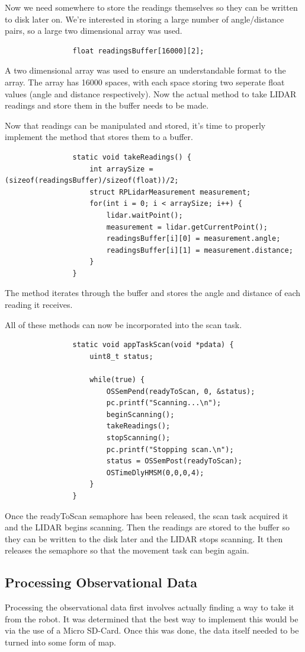 				Now we need somewhere to store the readings themselves so they can be written to disk later on. We're interested in storing a large number of angle/distance pairs, so a large two dimensional array was used.
				\begin{lstlisting}
				float readingsBuffer[16000][2];
				\end{lstlisting}
				A two dimensional array was used to ensure an understandable format to the array. The array has 16000 spaces, with each space storing two seperate float values (angle and distance respectively). Now the actual method to take LIDAR readings and store them in the buffer needs to be made.
				
				Now that readings can be manipulated and stored, it's time to properly implement the method that stores them to a buffer.
				\begin{lstlisting}
				static void takeReadings() {
					int arraySize = (sizeof(readingsBuffer)/sizeof(float))/2;
					struct RPLidarMeasurement measurement;
					for(int i = 0; i < arraySize; i++) {
						lidar.waitPoint();
						measurement = lidar.getCurrentPoint();
						readingsBuffer[i][0] = measurement.angle;
						readingsBuffer[i][1] = measurement.distance;
					}
				}
				\end{lstlisting}
				The method iterates through the buffer and stores the angle and distance of each reading it receives.
				
				All of these methods can now be incorporated into the scan task.
				\begin{lstlisting}
				static void appTaskScan(void *pdata) {
					uint8_t status;
				
					while(true) {
						OSSemPend(readyToScan, 0, &status);
						pc.printf("Scanning...\n");
						beginScanning();
						takeReadings();
						stopScanning();
						pc.printf("Stopping scan.\n");
						status = OSSemPost(readyToScan);
						OSTimeDlyHMSM(0,0,0,4);
					}
				}
				\end{lstlisting}
				Once the readyToScan semaphore has been released, the scan task acquired it and the LIDAR begins scanning. Then the readings are stored to the buffer so they can be written to the disk later and the LIDAR stops scanning. It then releases the semaphore so that the movement task can begin again.		
				
			\subsection{Processing Observational Data}
			Processing the observational data first involves actually finding a way to take it from the robot. It was determined that the best way to implement this would be via the use of a Micro SD-Card. Once this was done, the data itself needed to be turned into some form of map.
			
